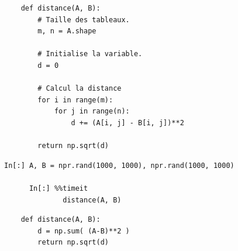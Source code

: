 \documentclass[aspectratio=169]{beamer}
\begin{document}

\frame{
  \vfill
  \centering

  \[
  \| \bm{A} - \bm{B} \|_2 = \sqrt{\sum_{i=1}^m \sum_{j=1}^n (A_{ij} - B_{ij})^2}
  \]

  \vfill
}

\begin{frame}[fragile]{}{}
  \vfill
  \begin{lstlisting}
    def distance(A, B):
        # Taille des tableaux.
        m, n = A.shape

        # Initialise la variable.
        d = 0

        # Calcul la distance
        for i in range(m):
            for j in range(n):
                d += (A[i, j] - B[i, j])**2

        return np.sqrt(d)
  \end{lstlisting}
  \vfill
\end{frame}

{
  \begin{frame}[fragile]{}{}
    \vfill
    \begin{lstlisting}[backgroundcolor=\color{white}, basicstyle=\ttfamily\footnotesize\color{black}]
      In[:] A, B = npr.rand(1000, 1000), npr.rand(1000, 1000)
      
      In[:] %%timeit
              distance(A, B)
    \end{lstlisting}
    \hspace{1cm}
    \footnotesize{\texttt{}}
    
    \vfill
  \end{frame}
}





\begin{frame}[fragile]{}{}
  \vfill
  \begin{lstlisting}
    def distance(A, B):
        d = np.sum( (A-B)**2 )
        return np.sqrt(d)
  \end{lstlisting}
  \vfill
\end{frame}
\end{document}
